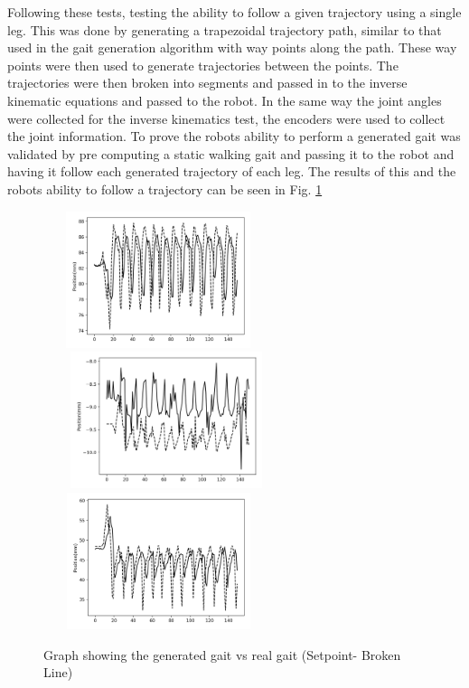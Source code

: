 \documentclass[12pt]{report}
\begin{document}
Following these tests, testing the ability to follow a given trajectory using a single leg. This was done by generating a trapezoidal trajectory path, similar to that used in the gait generation algorithm with way points along the path. These way points were then used to generate trajectories between the points. The trajectories were then broken into segments and passed in to the inverse kinematic equations and passed to the robot. In the same way the joint angles were collected for the inverse kinematics test, the encoders were used to collect the joint information. To prove the robots ability to perform a generated gait was validated by pre computing a static walking gait and passing it to the robot and having it follow each generated trajectory of each leg. The results of this and the robots ability to follow a trajectory can be seen in Fig. \ref{fig:gait}
    \begin{figure}[H]
	\centering
      \hspace{2mm}
      \includegraphics[width=0.6\textwidth, height =4cm]{Images/GaitPlotX.png} %
      \hspace{-37mm}%
      \includegraphics[width=0.64\textwidth, height =4cm]{Images/GaitPlotY.png} %
        \hspace{2mm}
      \includegraphics[width=0.6\textwidth, height =4cm]{Images/GaitPlotZ.png} %
  	\caption{Graph showing the generated gait vs real gait (Setpoint- Broken Line)}
  	\label{fig:gait}
\end{figure}
\end{document}
